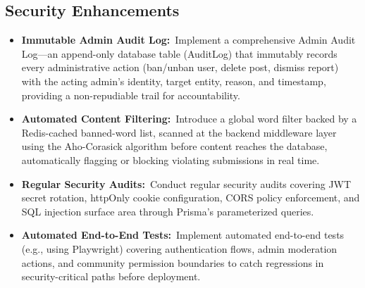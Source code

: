 \subsection{Security Enhancements}
\begin{itemize}
  \item \textbf{Immutable Admin Audit Log:}~Implement a comprehensive Admin Audit Log---an append-only database table (AuditLog) that immutably records every administrative action (ban/unban user, delete post, dismiss report) with the acting admin's identity, target entity, reason, and timestamp, providing a non-repudiable trail for accountability.
  \item \textbf{Automated Content Filtering:}~Introduce a global word filter backed by a Redis-cached banned-word list, scanned at the backend middleware layer using the Aho-Corasick algorithm before content reaches the database, automatically flagging or blocking violating submissions in real time.
  \item \textbf{Regular Security Audits:}~Conduct regular security audits covering JWT secret rotation, httpOnly cookie configuration, CORS policy enforcement, and SQL injection surface area through Prisma's parameterized queries.
  \item \textbf{Automated End-to-End Tests:}~Implement automated end-to-end tests (e.g., using Playwright) covering authentication flows, admin moderation actions, and community permission boundaries to catch regressions in security-critical paths before deployment.
\end{itemize}

